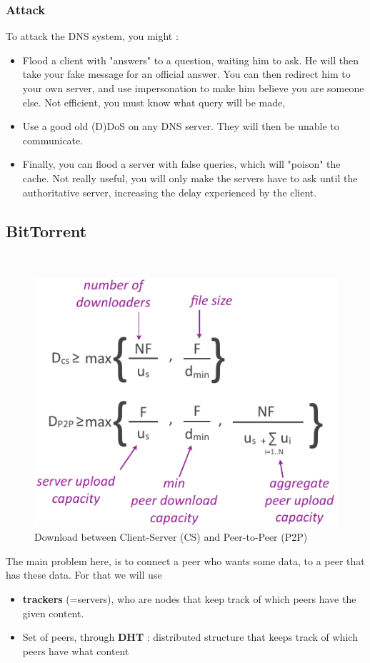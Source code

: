 \documentclass[12pt,a4paper]{article}
\begin{document}
\subsubsection{Attack}
To attack the DNS system, you might :
\begin{itemize}
	\item 	Flood a client with "answers" to a question, waiting him to ask. He will then take your fake message for an official answer. You can then redirect him to your own server, and use impersonation to make him believe you are someone else. Not efficient, you must know what query will be made,
	\item 	Use a good old (D)DoS on any DNS server. They will then be unable to communicate. 
	\item 	Finally, you can flood a server with false queries, which will "poison" the cache. Not really useful, you will only make the servers have to ask until the authoritative server, increasing the delay experienced by the client.
\end{itemize}

\subsection{BitTorrent}~
\begin{figure}[!h]
	 \centering
	 \includegraphics[scale=0.5]{images/download}
	 \caption{Download between Client-Server (CS) and Peer-to-Peer (P2P)}
	 \label{fig: download p2p}
\end{figure}

The main problem here, is to connect a peer who wants some data, to a peer that has these data. For that we will use 
\begin{itemize}
	\item 	\textbf{trackers} (=servers), who are nodes that keep track of which peers have the given content.
	\item 	Set of peers, through \textbf{DHT} : distributed structure that keeps track of which peers have what content 
\end{itemize}
\end{document}
